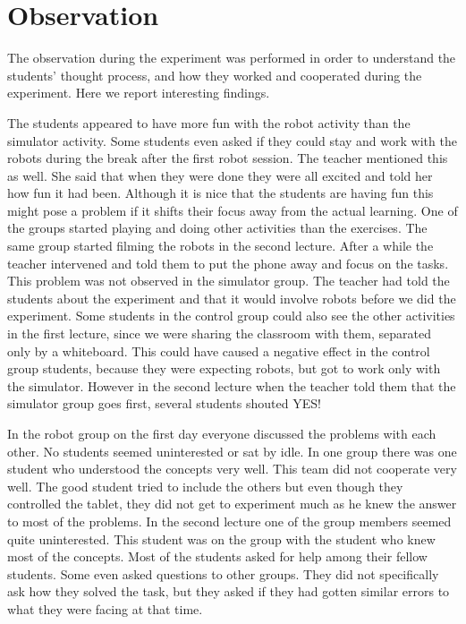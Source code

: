 \section{Observation}
The observation during the experiment was performed in order to understand the students' thought process, and how they worked and cooperated during the experiment. Here we report interesting findings.

\bigskip\noindent
The students appeared to have more fun with the robot activity than the simulator activity. 
Some students even asked if they could stay and work with the robots during the break after the first robot session. 
The teacher mentioned this as well. She said that when they were done they were all excited and told her how fun it had been. Although it is nice that the students are having fun this might pose a problem if it shifts their focus away from the actual learning. One of the groups started playing and doing other activities than the exercises. The same group started filming the robots in the second lecture. After a while the teacher intervened and told them to put the phone away and focus on the tasks. This problem was not observed in the simulator group. 
The teacher had told the students about the experiment and that it would involve robots before we did the experiment. 
Some students in the control group could also see the other activities in the first lecture, since we were sharing the classroom with them, separated only by a whiteboard.
This could have caused a negative effect in the control group students, because they were expecting robots, but got to work only with the simulator. 
However in the second lecture when the teacher told them that the simulator group goes first, several students shouted YES! 

\bigskip\noindent
In the robot group on the first day everyone discussed the problems with each other. No students seemed uninterested or sat by idle. In one group there was one student who understood the concepts very well. This team did not cooperate very well. The good student tried to include the others but even though they controlled the tablet, they did not get to experiment much as he knew the answer to most of the problems. In the second lecture one of the group members seemed quite uninterested. This student was on the group with the student who knew most of the concepts. Most of the students asked for help among their fellow students. Some even asked questions to other groups. They did not specifically ask how they solved the task, but they asked if they had gotten similar errors to what they were facing at that time.

